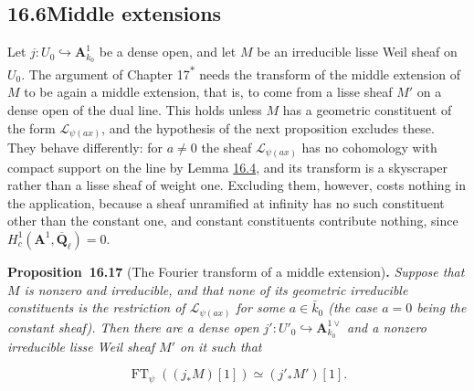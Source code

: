\documentclass[11pt]{article}
\newenvironment{bpstatement}[2]{\par\addvspace{0.6\baselineskip}\noindent\textbf{#1}#2\textbf{.}\enspace\ignorespaces}
  {\par\addvspace{0.4\baselineskip}}
\newenvironment{bpstatementit}[2]{\begin{bpstatement}{#1}{#2}\itshape\ignorespaces}{\end{bpstatement}}
\newcommand{\bpout}[1]{#1\textsuperscript{\hyperlink{bp-outside}{\ensuremath{\ast}}}}
\begin{document}
\subsection*{\texorpdfstring{16.6\quad Middle extensions}{16.6 Middle extensions}}
\label{bp50}%
\label{bp51}%
Let \(j:U_0\hookrightarrow\mathbf A^1_{k_0}\) be a dense open, and let \(M\) be an irreducible lisse Weil sheaf on \(U_0\). The argument of Chapter \bpout{17} needs the transform of the middle extension of \(M\) to be again a middle extension, that is, to come from a lisse sheaf \(M'\) on a dense open of the dual line. This holds unless \(M\) has a geometric constituent of the form \(\mathcal L_{\psi(ax)}\), and the hypothesis of the next proposition excludes these. They behave differently: for \(a\ne0\) the sheaf \(\mathcal L_{\psi(ax)}\) has no cohomology with compact support on the line by Lemma \hyperref[bp13]{16.4}, and its transform is a skyscraper rather than a lisse sheaf of weight one. Excluding them, however, costs nothing in the application, because a sheaf unramified at infinity has no such constituent other than the constant one, and constant constituents contribute nothing, since \(H^1_c(\mathbf A^1,\overline{\mathbf Q}_\ell)=0\).

\label{bp52}%
\begin{bpstatementit}{Proposition~16.17}{ (The Fourier transform of a middle extension)}
Suppose that \(M\) is nonzero and irreducible, and that none of its geometric irreducible constituents is the restriction of \(\mathcal L_{\psi(ax)}\) for some \(a\in\bar k_0\) (the case \(a=0\) being the constant sheaf). Then there are a dense open \(j':U'_0\hookrightarrow\mathbf A^{1\vee}_{k_0}\) and a nonzero irreducible lisse Weil sheaf \(M'\) on it such that

\[
\operatorname{FT}_\psi((j_*M)[1])\simeq(j'_*M')[1].
\]
\end{bpstatementit}
\end{document}
